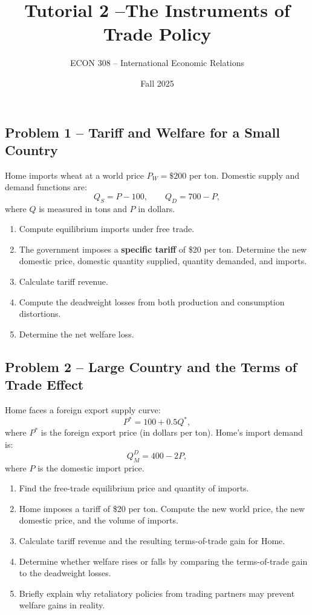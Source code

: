 \documentclass[12pt]{article}
\title{Tutorial 2 --The Instruments of Trade Policy}
\author{ECON 308 -- International Economic Relations}
\date{Fall 2025}
\begin{document}
\maketitle



\subsection*{Problem 1 -- Tariff and Welfare for a Small Country}

Home imports wheat at a world price \(P_W = \$200\) per ton.  
Domestic supply and demand functions are:
\[
Q_S = P - 100, \qquad Q_D = 700 - P,
\]
where \(Q\) is measured in tons and \(P\) in dollars.

\begin{enumerate}[label=(\alph*)]
\item Compute equilibrium imports under free trade.  
\item The government imposes a \textbf{specific tariff} of \$20 per ton.  
Determine the new domestic price, domestic quantity supplied, quantity demanded, and imports.
\item Calculate tariff revenue.  
\item Compute the deadweight losses from both production and consumption distortions.
\item Determine the net welfare loss.
\end{enumerate}

\vspace{1.2em}

\subsection*{Problem 2 -- Large Country and the Terms of Trade Effect}

Home faces a foreign export supply curve:
\[
P^* = 100 + 0.5Q^*,
\]
where \(P^*\) is the foreign export price (in dollars per ton).  
Home's import demand is:
\[
Q_M^D = 400 - 2P,
\]
where \(P\) is the domestic import price.

\begin{enumerate}[label=(\alph*)]
\item Find the free-trade equilibrium price and quantity of imports.  
\item Home imposes a tariff of \$20 per ton.  
Compute the new world price, the new domestic price, and the volume of imports.
\item Calculate tariff revenue and the resulting terms-of-trade gain for Home.  
\item Determine whether welfare rises or falls by comparing the terms-of-trade gain to the deadweight losses.
\item Briefly explain why retaliatory policies from trading partners may prevent welfare gains in reality.
\end{enumerate}
\end{document}
